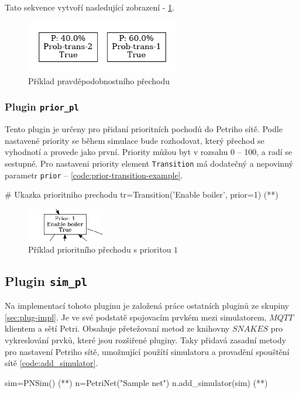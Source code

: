 Tato sekvence vytvoří nasledující zobrazení - \ref{prob-transition}.

\begin{figure}[hbt]
  \centering
  \includegraphics[width=0.6\textwidth]{obrazky-figures/prob-transition.png}
  \caption{Příklad pravděpodobnostního přechodu}
  \label{prob-transition}
\end{figure}

\subsubsection{Plugin \texttt{prior\_pl}}
\label{subsec:prior_pl}
Tento plugin je určeny pro přidaní prioritních pochodů do Petriho sítě. Podle nastavené priority se během simulace bude rozhodovat, který přechod se vyhodnotí a provede jako první. Priority můžou byt v rozsahu 0 -- 100, a radí se sestupné. Pro nastaveni priority element \texttt{Transition} má dodatečný a nepovinný parametr \texttt{prior} -- \ref{code:prior-transition-example}.
\begin{python}
  # Ukazka prioritniho prechodu
  tr=Transition('Enable boiler', prior=1) (*\label{code:prior-transition-example}*)
\end{python}

\begin{figure}[hbt]
  \centering
  \includegraphics[width=0.3\textwidth]{obrazky-figures/prior-transition.png}
  \caption{Příklad prioritního přechodu s prioritou $1$}
  \label{prior-transition}
\end{figure}

\subsection{Plugin \texttt{sim\_pl}}
\label{sec:aplikace-mqtt}
Na implementací tohoto pluginu je založená práce ostatních pluginů ze skupiny \ref{sec:plug-impl}. Je ve své podstatě spojovacím prvkém mezi simulatorem, $MQTT$ klientem a sětí Petri. Obsahuje přetežovaní metod ze knihovny $SNAKES$ pro vykreslování prvků, které jsou rozšiřené pluginy. Taky přidavá zasadní metody pro nastavení Petriho sítě, umožnující použítí simulatoru a provadění spouštění sítě \ref{code:add_simulator}.
\begin{python}
  sim=PNSim() (*\label{code:sim-add}*)
  n=PetriNet("Sample net")
  n.add_simulator(sim) (*\label{code:add_simulator}*)
\end{python}

